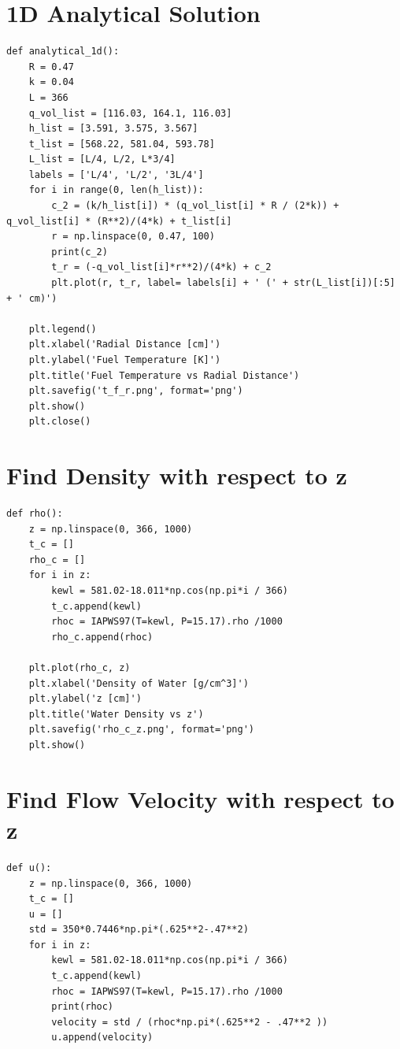 \documentclass[12pt,letterpaper]{article}
\begin{document}
\begin{appendices}
\section{1D Analytical Solution}

\begin{verbatim}
def analytical_1d():
    R = 0.47
    k = 0.04
    L = 366
    q_vol_list = [116.03, 164.1, 116.03]
    h_list = [3.591, 3.575, 3.567]
    t_list = [568.22, 581.04, 593.78]
    L_list = [L/4, L/2, L*3/4]
    labels = ['L/4', 'L/2', '3L/4']
    for i in range(0, len(h_list)):
        c_2 = (k/h_list[i]) * (q_vol_list[i] * R / (2*k)) + q_vol_list[i] * (R**2)/(4*k) + t_list[i]
        r = np.linspace(0, 0.47, 100)
        print(c_2)
        t_r = (-q_vol_list[i]*r**2)/(4*k) + c_2
        plt.plot(r, t_r, label= labels[i] + ' (' + str(L_list[i])[:5] + ' cm)')

    plt.legend()
    plt.xlabel('Radial Distance [cm]')
    plt.ylabel('Fuel Temperature [K]')
    plt.title('Fuel Temperature vs Radial Distance')
    plt.savefig('t_f_r.png', format='png')
    plt.show()
    plt.close()
\end{verbatim}

\section{Find Density with respect to z}
\begin{verbatim}
def rho():
    z = np.linspace(0, 366, 1000)
    t_c = []
    rho_c = []
    for i in z:
        kewl = 581.02-18.011*np.cos(np.pi*i / 366)
        t_c.append(kewl)
        rhoc = IAPWS97(T=kewl, P=15.17).rho /1000
        rho_c.append(rhoc)

    plt.plot(rho_c, z)
    plt.xlabel('Density of Water [g/cm^3]')
    plt.ylabel('z [cm]')
    plt.title('Water Density vs z')
    plt.savefig('rho_c_z.png', format='png')
    plt.show() 
\end{verbatim}

\section{Find Flow Velocity with respect to z}
\begin{verbatim}
def u():
    z = np.linspace(0, 366, 1000)
    t_c = []
    u = []
    std = 350*0.7446*np.pi*(.625**2-.47**2)
    for i in z:
        kewl = 581.02-18.011*np.cos(np.pi*i / 366)
        t_c.append(kewl)
        rhoc = IAPWS97(T=kewl, P=15.17).rho /1000
        print(rhoc)
        velocity = std / (rhoc*np.pi*(.625**2 - .47**2 ))
        u.append(velocity)


\end{verbatim}
\end{appendices}
\end{document}
